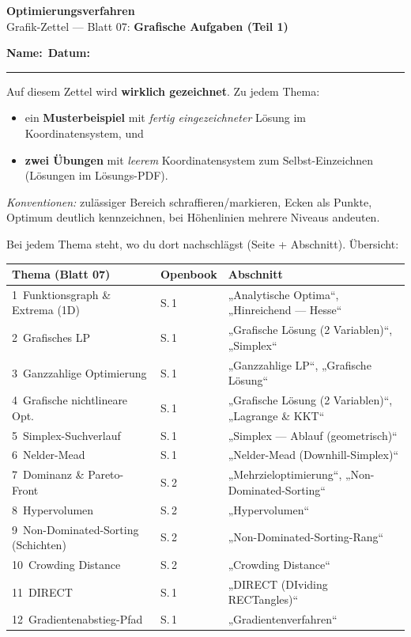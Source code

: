 \documentclass[a4paper,11pt]{article}
\newcommand{\titel}[1]{\begin{center}{\LARGE\color{accent}\textbf{Optimierungsverfahren}}\\[3pt]{\large #1}\end{center}\vspace{1mm}\noindent\textbf{Name:}\ \underline{\hspace{6cm}}\hfill\textbf{Datum:}\ \underline{\hspace{4cm}}\\[3pt]{\color{gridcol}\rule{\linewidth}{0.4pt}}\vspace{2mm}}
\begin{document}
\titel{Grafik-Zettel --- Blatt 07: \textbf{Grafische Aufgaben (Teil 1)}}

\noindent Auf diesem Zettel wird \textbf{wirklich gezeichnet}. Zu jedem Thema:
\begin{itemize}[nosep,leftmargin=1.4em]
  \item ein \textbf{Musterbeispiel} mit \emph{fertig eingezeichneter} Lösung im Koordinatensystem, und
  \item \textbf{zwei Übungen} mit \emph{leerem} Koordinatensystem zum Selbst-Einzeichnen (Lösungen im Lösungs-PDF).
\end{itemize}
\emph{Konventionen:} zulässiger Bereich schraffieren/markieren, Ecken als Punkte, Optimum deutlich
kennzeichnen, bei Höhenlinien mehrere Niveaus andeuten.
\par\vspace{2mm}
 Bei jedem Thema steht, wo du
dort nachschlägst (Seite + Abschnitt). Übersicht:
\par\vspace{1.5mm}
\begin{center}\small
\renewcommand{\arraystretch}{1.25}
\begin{tabular}{>{\color{accent}}l l l}
\textbf{Thema (Blatt 07)} & \textbf{Openbook} & \textbf{Abschnitt}\\\hline
1\ Funktionsgraph \& Extrema (1D) & S.\,1 & „Analytische Optima``, „Hinreichend --- Hesse``\\
2\ Grafisches LP & S.\,1 & „Grafische Lösung (2 Variablen)``, „Simplex``\\
3\ Ganzzahlige Optimierung & S.\,1 & „Ganzzahlige LP``, „Grafische Lösung``\\
4\ Grafische nichtlineare Opt. & S.\,1 & „Grafische Lösung (2 Variablen)``, „Lagrange \& KKT``\\
5\ Simplex-Suchverlauf & S.\,1 & „Simplex --- Ablauf (geometrisch)``\\
6\ Nelder-Mead & S.\,1 & „Nelder-Mead (Downhill-Simplex)``\\
7\ Dominanz \& Pareto-Front & S.\,2 & „Mehrzieloptimierung``, „Non-Dominated-Sorting``\\
8\ Hypervolumen & S.\,2 & „Hypervolumen``\\
9\ Non-Dominated-Sorting (Schichten) & S.\,2 & „Non-Dominated-Sorting-Rang``\\
10\ Crowding Distance & S.\,2 & „Crowding Distance``\\
11\ DIRECT & S.\,1 & „DIRECT (DIviding RECTangles)``\\
12\ Gradientenabstieg-Pfad & S.\,1 & „Gradientenverfahren``\\
\end{tabular}
\end{center}
\par\vspace{1mm}{\color{gridcol}\rule{\linewidth}{0.4pt}}
\end{document}
